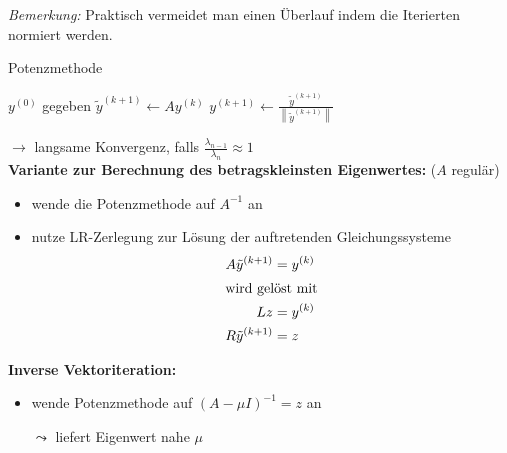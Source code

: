 \documentclass[%
a4paper,
11pt,		%
]
{scrartcl}
\theoremstyle{plain}
\theoremstyle{plain}
\theoremstyle{plain}
\theoremstyle{plain}
\begin{document}
\textit{Bemerkung:} Praktisch vermeidet man einen Überlauf indem die Iterierten normiert werden.

\newpage

\begin{algorithm}
\caption{Potenzmethode}
\begin{algorithmic}
  \STATE $y^{(0)}$ gegeben
  \REPEAT
    \STATE $\tilde{y}^{(k+1)} \gets Ay^{(k)}$
    \STATE $y^{(k+1)} \gets \frac{\tilde{y}^{(k+1)}}{\left\| \tilde{y}^{(k+1)} \right\|}$ 
\end{algorithmic}
\end{algorithm}
$\to$ langsame Konvergenz, falls $\frac{\lambda_{n-1}}{\lambda_n} \approx 1$\\

\textbf{Variante zur Berechnung des betragskleinsten Eigenwertes:} \hfill ($A$ regulär)

\begin{itemize}
    \item wende die Potenzmethode auf $A^{-1}$ an
    \item nutze LR-Zerlegung zur Lösung der auftretenden Gleichungssysteme
      \begin{align*}
        A \tilde{y}^{(k+1)} & = y^{(k)}\\
        \intertext{wird gelöst mit}
        Lz & = y^{(k)}\\
        R \tilde{y}^{(k+1)} & = z
      \end{align*}
\end{itemize}

\textbf{Inverse Vektoriteration:}
\begin{itemize}
    \item wende Potenzmethode auf $\left( A - \mu I \right)^{-1} = z$ an
    \item[$\leadsto$] liefert Eigenwert nahe $\mu$
\end{itemize}


\end{document}
